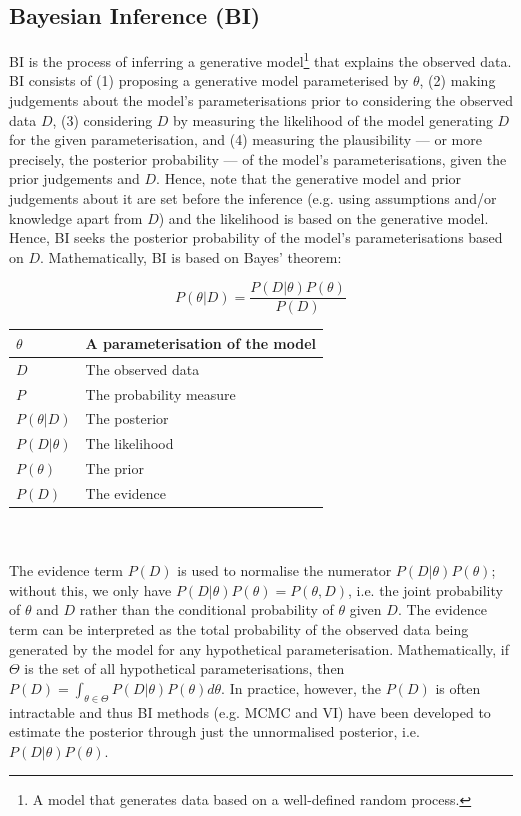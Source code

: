 \documentclass[conference]{IEEEtran}
\begin{document}
\subsection{Bayesian Inference (BI)}
BI is the process of inferring a generative model\footnote{A model that generates data based on a well-defined random process.} that explains the observed data. BI consists of (1) proposing a generative model parameterised by $\theta$, (2) making judgements about the model's parameterisations prior to considering the observed data $D$, (3) considering $D$ by measuring the likelihood of the model generating $D$ for the given parameterisation, and (4) measuring the plausibility — or more precisely, the posterior probability — of the model's parameterisations, given the prior judgements and $D$. Hence, note that the generative model and prior judgements about it are set before the inference (e.g. using assumptions and/or knowledge apart from $D$) and the likelihood is based on the generative model. Hence, BI seeks the posterior probability of the model's parameterisations based on $D$. Mathematically, BI is based on Bayes' theorem:

\begin{equation*}
    P(\theta|D) = \frac{P(D|\theta)P(\theta)}{P(D)}
\end{equation*}

\begin{tabular}{| m{1.5cm} | m{6cm} |}
    \hline
    $\theta$ & A parameterisation of the model\\
    \hline
    $D$ & The observed data\\
    \hline
    $P$ & The probability measure\\
    \hline
    $P(\theta|D)$ & The posterior\\
    \hline
    $P(D|\theta)$ & The likelihood\\
    \hline
    $P(\theta)$ & The prior\\
    \hline
    $P(D)$ & The evidence\\
    \hline
\end{tabular}\\~\\

The evidence term $P(D)$ is used to normalise the numerator $P(D|\theta)P(\theta)$; without this, we only have $P(D|\theta)P(\theta) = P(\theta, D)$, i.e. the joint probability of $\theta$ and $D$ rather than the conditional probability of $\theta$ given $D$. The evidence term can be interpreted as the total probability of the observed data being generated by the model for any hypothetical parameterisation. Mathematically, if $\Theta$ is the set of all hypothetical parameterisations, then $P(D) = \int_{\theta \in \Theta} P(D|\theta)P(\theta) d\theta$. In practice, however, the $P(D)$ is often intractable and thus BI methods (e.g. MCMC and VI) have been developed to estimate the posterior through just the unnormalised posterior, i.e. $P(D|\theta)P(\theta)$.
\end{document}
